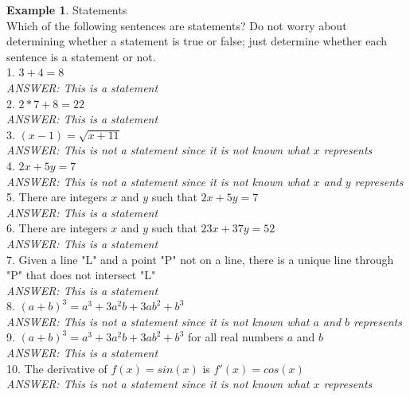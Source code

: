 \documentclass{book}
\theoremstyle{definition}
\newtheorem{example}{Example}[definition]
\theoremstyle{remark}
\begin{document}
\begin{example}
Statements \cite[Chap.1, P.C.1.1, Q.1-13]{ted} \\

Which of the following sentences are statements? 
Do not worry about determining whether a statement is true or false; just determine whether each sentence is a statement or not. \\


1. $3+4 = 8$ \\
{\it ANSWER: This is a statement} \\

2. $2*7 + 8 = 22$ \\
{\it ANSWER: This is a statement} \\

3. $(x-1)=\sqrt{x+11}$ \\
{\it ANSWER: This is not a statement since it is not known what $x$ represents} \\

4. $2x+5y=7$ \\
{\it ANSWER: This is not a statement since it is not known what $x$ and $y$ represents} \\

5. There are integers $x$ and $y$ such that $2x +5y =7$ \\
{\it ANSWER: This is a statement} \\

6. There are integers $x$ and $y$ such that $23x +37y =52$ \\
{\it ANSWER: This is a statement} \\

7. Given a line "L" and a point "P" not on a line, there is a unique line through "P" that does not intersect "L" \\
{\it ANSWER: This is a statement} \\

8. $(a+b)^3 = a^3 + 3a^2b + 3ab^2 + b^3$ \\
{\it ANSWER: This is not a statement since it is not known what $a$ and $b$ represents} \\

9. $(a+b)^3 = a^3 + 3a^2b + 3ab^2 + b^3$ for all real numbers $a$ and $b$\\
{\it ANSWER: This is a statement} \\

10. The derivative of $f(x) = sin(x)$ is $f'(x)=cos(x)$ \\
{\it ANSWER: This is not a statement since it is not known what $x$ represents} \\


\end{example}
\end{document}
